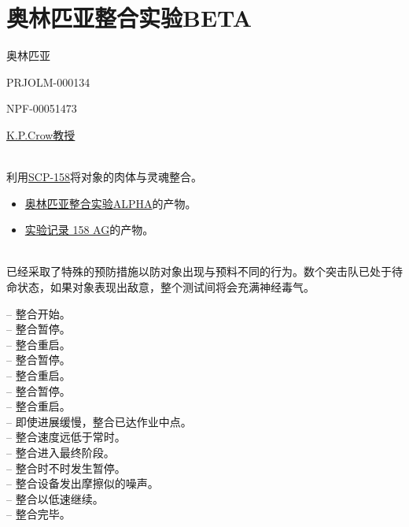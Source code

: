 \chapter{奥林匹亚整合实验BETA}

\label{chap:TALE-olympia-integration-experiment-beta}

奥林匹亚

PRJOLM-000134

NPF-00051473

\hyperref[chap:AUTHOR-kain-pathos-crow]{K.P.Crow教授}

\\
利用\hyperref[chap:SCP-158]{SCP-158}将对象的肉体与灵魂整合。


\begin{itemize}
\item \hyperref[chap:TALE-olympia-integration-experiment-alpha]{奥林匹亚整合实验ALPHA}的产物。
\item \hyperref[sec:DOC-experiment-log-158-ag]{实验记录 158 AG}的产物。
\end{itemize}

\\
已经采取了特殊的预防措施以防对象出现与预料不同的行为。数个突击队已处于待命状态，如果对象表现出敌意，整个测试间将会充满神经毒气。


\begin{scpbox}

 – 整合开始。\\
 – 整合暂停。\\
 – 整合重启。\\
 – 整合暂停。\\
 – 整合重启。\\
 – 整合暂停。\\
 – 整合重启。\\
 – 即使进展缓慢，整合已达作业中点。\\
 – 整合速度远低于常时。\\
 – 整合进入最终阶段。\\
 – 整合时不时发生暂停。\\
 – 整合设备发出摩擦似的噪声。\\
 – 整合以低速继续。\\
 – 整合完毕。

\end{scpbox}

\\
